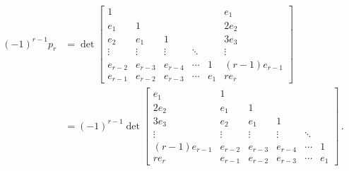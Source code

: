 \begin{align*}
      (-1)^{r-1} p_r
  &=  \det
      \begin{bmatrix}
        1       &         &         &         &     &   e_1         \\
        e_1     & 1       &         &         &     & 2 e_2         \\
        e_2     & e_1     & 1       &         &     & 3 e_3         \\
        \vdots  & \vdots  & \vdots  & \ddots  &     & \vdots        \\
        e_{r-2} & e_{r-3} & e_{r-4} & \cdots  & 1   & (r-1) e_{r-1} \\
        e_{r-1} & e_{r-2} & e_{r-3} & \cdots  & e_1 & r e_r
      \end{bmatrix}
  \\
  &=  (-1)^{r-1}
      \det
      \begin{bmatrix}
          e_1         & 1       &         &         &         &     \\
        2 e_2         & e_1     & 1       &         &         &     \\
        3 e_3         & e_2     & e_1     & 1       &         &     \\
        \vdots        & \vdots  & \vdots  & \vdots  & \ddots  &     \\
        (r-1) e_{r-1} & e_{r-2} & e_{r-3} & e_{r-4} & \cdots  & 1   \\
        r e_r         & e_{r-1} & e_{r-2} & e_{r-3} & \cdots  & e_1
      \end{bmatrix} \,.
\end{align*}
\endgroup




